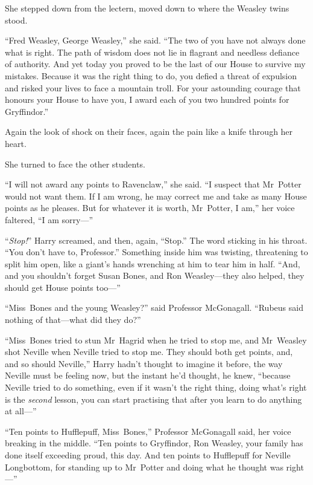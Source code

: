 She stepped down from the lectern, moved down to where the Weasley twins stood.

“Fred Weasley, George Weasley,” she said. “The two of you have not always done what is right. The path of wisdom does not lie in flagrant and needless defiance of authority. And yet today you proved to be the last of our House to survive my mistakes. Because it was the right thing to do, you defied a threat of expulsion and risked your lives to face a mountain troll. For your astounding courage that honours your House to have you, I award each of you two hundred points for Gryffindor.”

Again the look of shock on their faces, again the pain like a knife through her heart.

She turned to face the other students.

“I will not award any points to Ravenclaw,” she said. “I suspect that Mr~Potter would not want them. If I am wrong, he may correct me and take as many House points as he pleases. But for whatever it is worth, Mr~Potter, I am,” her voice faltered, “I am sorry—”

\later

“\emph{Stop!}” Harry screamed, and then, again, “Stop.” The word sticking in his throat. “You don’t have to, Professor.” Something inside him was twisting, threatening to split him open, like a giant’s hands wrenching at him to tear him in half. “And, and you shouldn’t forget Susan Bones, and Ron Weasley—they also helped, they should get House points too—”

“Miss~Bones and the young Weasley?” said Professor McGonagall. “Rubeus said nothing of that—what did they do?”

“Miss~Bones tried to stun Mr~Hagrid when he tried to stop me, and Mr~Weasley shot Neville when Neville tried to stop me. They should both get points, and, and so should Neville,” Harry hadn’t thought to imagine it before, the way Neville must be feeling now, but the instant he’d thought, he knew, “because Neville tried to do something, even if it wasn’t the right thing, doing what’s right is the \emph{second} lesson, you can start practising that after you learn to do anything at all—”

“Ten points to Hufflepuff, Miss~Bones,” Professor McGonagall said, her voice breaking in the middle. “Ten points to Gryffindor, Ron Weasley, your family has done itself exceeding proud, this day. And ten points to Hufflepuff for Neville Longbottom, for standing up to Mr~Potter and doing what he thought was right—”

